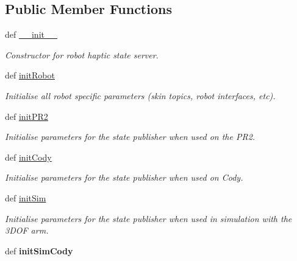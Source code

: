 \subsection*{\-Public \-Member \-Functions}
\begin{DoxyCompactItemize}
\item 
\hypertarget{classhrl__haptic__mpc_1_1robot__haptic__state__node_1_1_robot_haptic_state_server_a218e673403d0f6afb92a8a8e9509f9f4}{def \hyperlink{classhrl__haptic__mpc_1_1robot__haptic__state__node_1_1_robot_haptic_state_server_a218e673403d0f6afb92a8a8e9509f9f4}{\-\_\-\-\_\-init\-\_\-\-\_\-}}\label{classhrl__haptic__mpc_1_1robot__haptic__state__node_1_1_robot_haptic_state_server_a218e673403d0f6afb92a8a8e9509f9f4}

\begin{DoxyCompactList}\small\item\em \-Constructor for robot haptic state server. \end{DoxyCompactList}\item 
def \hyperlink{classhrl__haptic__mpc_1_1robot__haptic__state__node_1_1_robot_haptic_state_server_a768fa35b239e55cb11fb6f82abd422d5}{init\-Robot}
\begin{DoxyCompactList}\small\item\em \-Initialise all robot specific parameters (skin topics, robot interfaces, etc). \end{DoxyCompactList}\item 
def \hyperlink{classhrl__haptic__mpc_1_1robot__haptic__state__node_1_1_robot_haptic_state_server_ad10ab565925017b4cea38ae1709a81f8}{init\-P\-R2}
\begin{DoxyCompactList}\small\item\em \-Initialise parameters for the state publisher when used on the \-P\-R2. \end{DoxyCompactList}\item 
def \hyperlink{classhrl__haptic__mpc_1_1robot__haptic__state__node_1_1_robot_haptic_state_server_a29793b4800096ecae5352edce4a01a35}{init\-Cody}
\begin{DoxyCompactList}\small\item\em \-Initialise parameters for the state publisher when used on \-Cody. \end{DoxyCompactList}\item 
def \hyperlink{classhrl__haptic__mpc_1_1robot__haptic__state__node_1_1_robot_haptic_state_server_a0ca23cdde156127c080e36bdcd164879}{init\-Sim}
\begin{DoxyCompactList}\small\item\em \-Initialise parameters for the state publisher when used in simulation with the 3\-D\-O\-F arm. \end{DoxyCompactList}\item 
\hypertarget{classhrl__haptic__mpc_1_1robot__haptic__state__node_1_1_robot_haptic_state_server_af9a247d32698326307aef9dd3b0b00e7}{def {\bfseries init\-Sim\-Cody}}\label{classhrl__haptic__mpc_1_1robot__haptic__state__node_1_1_robot_haptic_state_server_af9a247d32698326307aef9dd3b0b00e7}


\end{DoxyCompactItemize}
